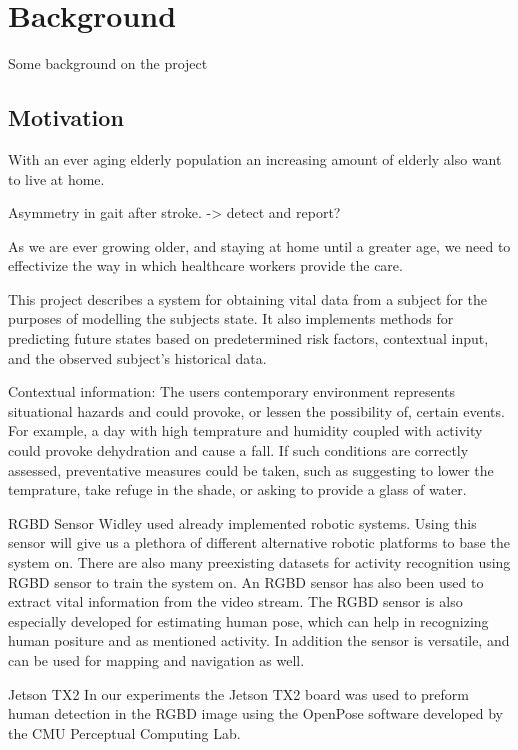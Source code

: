\chapter{Background}
Some background on the project

\section{Motivation}
With an ever aging elderly population an increasing amount of elderly also want to live at home. 

Asymmetry in gait after stroke. -> detect and report?





As we are ever growing older, and staying at home until a greater age, we need to effectivize the way in which healthcare workers provide the care. 

This project describes a system for obtaining vital data from a subject for the purposes of modelling the subjects state. It also implements methods for predicting future states based on predetermined risk factors, contextual input, and the observed subject's historical data.


Contextual information: The users contemporary environment represents situational hazards and could provoke, or lessen the possibility of, certain events. For example, a day with high temprature and humidity coupled with activity could provoke dehydration and cause a fall. If such conditions are correctly assessed, preventative measures could be taken, such as suggesting to lower the temprature, take refuge in the shade, or asking to provide a glass of water.


RGBD Sensor
Widley used already implemented robotic systems. Using this sensor will give us a plethora of different alternative robotic platforms to base the system on. There are also many preexisting datasets for activity recognition using RGBD sensor to train the system on. An RGBD sensor has also been used to extract vital information from the video stream.
The RGBD sensor is also especially developed for estimating human pose, which can help in recognizing human positure and as mentioned activity.
In addition the sensor is versatile, and can be used for mapping and navigation as well.

Jetson TX2
In our experiments the Jetson TX2 board was used to preform human detection in the RGBD image using the OpenPose software developed by the CMU Perceptual Computing Lab. 

